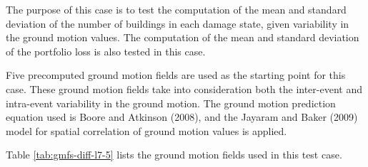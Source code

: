 The purpose of this case is to test the computation of the mean and standard deviation of the number of buildings in each damage state, given variability in the ground motion values. The computation of the mean and standard deviation of the portfolio loss is also tested in this case.

Five precomputed ground motion fields are used as the starting point for this case. These ground motion fields take into consideration both the inter-event and intra-event variability in the ground motion. The ground motion prediction equation used is Boore and Atkinson (2008), and the Jayaram and Baker (2009) model for spatial correlation of ground motion values is applied.



Table \ref{tab:gmfs-diff-l7-5} lists the ground motion fields used in this test case.